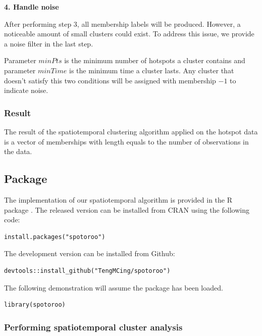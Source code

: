 \textbf{4. Handle noise}

After performing step 3, all membership labels will be produced.
However, a noticeable amount of small clusters could exist. To address
this issue, we provide a noise filter in the last step.

Parameter \(minPts\) is the minimum number of hotspots a cluster
contains and parameter \(minTime\) is the minimum time a cluster lasts.
Any cluster that doesn't satisfy this two conditions will be assigned
with membership \(-1\) to indicate noise.

\hypertarget{result}{%
\subsubsection{Result}\label{result}}

The result of the spatiotemporal clustering algorithm applied on the
hotspot data is a vector of memberships with length equals to the number
of observations in the data.

\hypertarget{package}{%
\subsection{Package}\label{package}}

The implementation of our spatiotemporal algorithm is provided in the R
package . The released version can be installed from
CRAN using the following code:

\begin{verbatim}
install.packages("spotoroo")
\end{verbatim}

The development version can be installed from Github:

\begin{verbatim}
devtools::install_github("TengMCing/spotoroo")
\end{verbatim}

The following demonstration will assume the package 
has been loaded.

\begin{verbatim}
library(spotoroo)
\end{verbatim}

\hypertarget{performing-spatiotemporal-cluster-analysis}{%
\subsubsection{Performing spatiotemporal cluster
analysis}\label{performing-spatiotemporal-cluster-analysis}}

